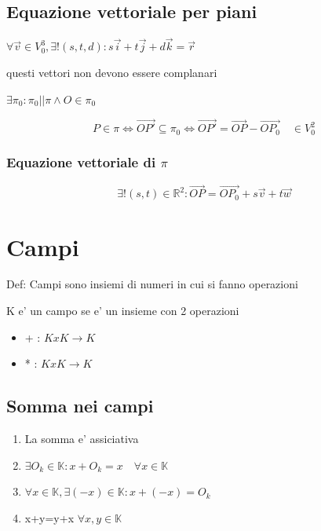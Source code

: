 \documentclass{article}
\begin{document}
\subsection*{Equazione vettoriale per piani}
\begin{flushleft}
	$\forall \overrightarrow{v} \in V^3_0, \exists ! (s,t,d):
		s\overrightarrow{i} + t\overrightarrow{j} + d\overrightarrow{k} = \overrightarrow{r}$
\end{flushleft}
\begin{flushleft}
	questi vettori non devono essere complanari
\end{flushleft}
\begin{flushleft}
	$ \exists \pi_0 :\pi_0 || \pi \land O \in  \pi_0$
\end{flushleft}
\begin{equation*}
	P\in \pi \iff \overrightarrow{OP'} \subseteq \pi_0 \iff \overrightarrow{OP'}=\overrightarrow{OP} - \overrightarrow{OP_0} \quad \in V^2_0
\end{equation*}
\subsubsection*{Equazione vettoriale di $\pi$}
\begin{equation*}
	\exists ! (s,t) \in \mathbb{R}^2:\overrightarrow{OP}=\overrightarrow{OP_0}+s\overrightarrow{v}+t\overrightarrow{w}
\end{equation*}

\section{Campi}
\begin{flushleft}
	Def: Campi sono insiemi di numeri in cui si fanno operazioni
\end{flushleft}
\begin{flushleft}
	K e' un campo se e' un insieme con 2 operazioni
\end{flushleft}
\begin{itemize}
	\item + : $KxK \to K$
	\item * : $KxK \to K$
\end{itemize}
\subsection{Somma nei campi}
\begin{enumerate}
	\item La somma e' assiciativa
	\item $\exists O_k \in \mathbb{K} : x+O_k=x \quad \forall x\in \mathbb{K}$
	\item $\forall x \in  \mathbb{K},\exists (-x) \in \mathbb{K}:x+(-x)=O_k$
	\item x+y=y+x $\forall x,y \in \mathbb{K}$
\end{enumerate}
\end{document}
